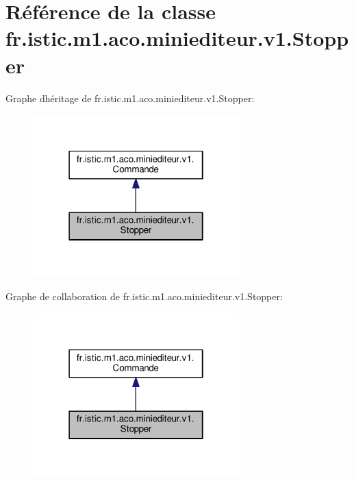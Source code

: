 \hypertarget{classfr_1_1istic_1_1m1_1_1aco_1_1miniediteur_1_1v1_1_1Stopper}{}\section{Référence de la classe fr.\+istic.\+m1.\+aco.\+miniediteur.\+v1.\+Stopper}
\label{classfr_1_1istic_1_1m1_1_1aco_1_1miniediteur_1_1v1_1_1Stopper}


Graphe d\textquotesingle{}héritage de fr.\+istic.\+m1.\+aco.\+miniediteur.\+v1.\+Stopper\+:\nopagebreak
\begin{figure}[H]
\begin{center}
\leavevmode
\includegraphics[width=226pt]{classfr_1_1istic_1_1m1_1_1aco_1_1miniediteur_1_1v1_1_1Stopper__inherit__graph}
\end{center}
\end{figure}


Graphe de collaboration de fr.\+istic.\+m1.\+aco.\+miniediteur.\+v1.\+Stopper\+:\nopagebreak
\begin{figure}[H]
\begin{center}
\leavevmode
\includegraphics[width=226pt]{classfr_1_1istic_1_1m1_1_1aco_1_1miniediteur_1_1v1_1_1Stopper__coll__graph}
\end{center}
\end{figure}
